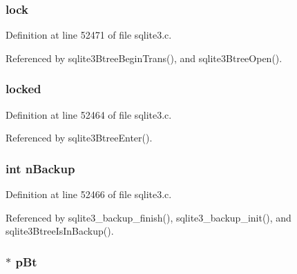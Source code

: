 \hypertarget{struct_btree_a6e91b33e34747daf58cc28ca4994925b}{}
\subsubsection[{lock}]{ lock}\label{struct_btree_a6e91b33e34747daf58cc28ca4994925b}


Definition at line 52471 of file sqlite3.\+c.



Referenced by sqlite3\+Btree\+Begin\+Trans(), and sqlite3\+Btree\+Open().

\hypertarget{struct_btree_a43f3e82288339ce627521922c87afa2d}{}
\subsubsection[{locked}]{ locked}\label{struct_btree_a43f3e82288339ce627521922c87afa2d}


Definition at line 52464 of file sqlite3.\+c.



Referenced by sqlite3\+Btree\+Enter().

\hypertarget{struct_btree_a0368c820089e3c6f7bc698c6bbe82339}{}
\subsubsection[{n\+Backup}]{\setlength{\rightskip}{0pt plus 5cm}int n\+Backup}\label{struct_btree_a0368c820089e3c6f7bc698c6bbe82339}


Definition at line 52466 of file sqlite3.\+c.



Referenced by sqlite3\+\_\+backup\+\_\+finish(), sqlite3\+\_\+backup\+\_\+init(), and sqlite3\+Btree\+Is\+In\+Backup().

\hypertarget{struct_btree_a2bc66d19c064bb25ff335241f8c621df}{}
\subsubsection[{p\+Bt}]{$\ast$ p\+Bt}\label{struct_btree_a2bc66d19c064bb25ff335241f8c621df}



